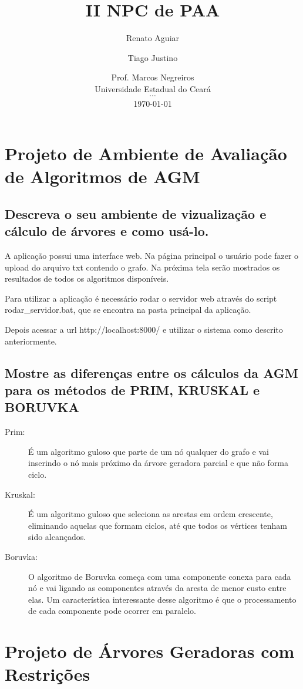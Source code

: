 \documentclass[12pt,a4paper]{article}
\title{II NPC de PAA}
\author{ Renato Aguiar \and Tiago Justino }
\date{
    Prof. Marcos Negreiros \\
	Universidade Estadual do Ceará \\
	$\cdots$ \\
	\today
}
\begin{document}
\maketitle

\section{Projeto de Ambiente de Avaliação de Algoritmos de AGM}
\subsection{Descreva o seu ambiente de vizualização e cálculo de árvores e como
usá-lo.}

A aplicação possui uma interface web. Na página principal o usuário pode fazer
o upload do arquivo txt contendo o grafo. Na próxima tela serão mostrados os
resultados de todos os algoritmos disponíveis.

Para utilizar a aplicação é necessário rodar o servidor web através do script
rodar\_servidor.bat, que se encontra na pasta principal da aplicação.

Depois acessar a url http://localhost:8000/ e utilizar o sistema como descrito
anteriormente.

\subsection{Mostre as diferenças entre os cálculos da AGM para os métodos de
PRIM, KRUSKAL e BORUVKA}

\begin{description}
\item[Prim:] É um algoritmo guloso que parte de um nó qualquer do grafo e vai
inserindo o nó mais próximo da árvore geradora parcial e que não forma ciclo.
\item[Kruskal:] É um algoritmo guloso que seleciona as arestas em ordem crescente,
eliminando aquelas que formam ciclos, até que todos os vértices tenham sido
alcançados.
\item[Boruvka:] O algoritmo de Boruvka começa com uma componente conexa para
cada nó e vai ligando as componentes através da aresta de menor custo entre
elas. Um característica interessante desse algoritmo é que o processamento de
cada componente pode ocorrer em paralelo.
\end{description}

\section{Projeto de Árvores Geradoras com Restrições}
\end{document}
